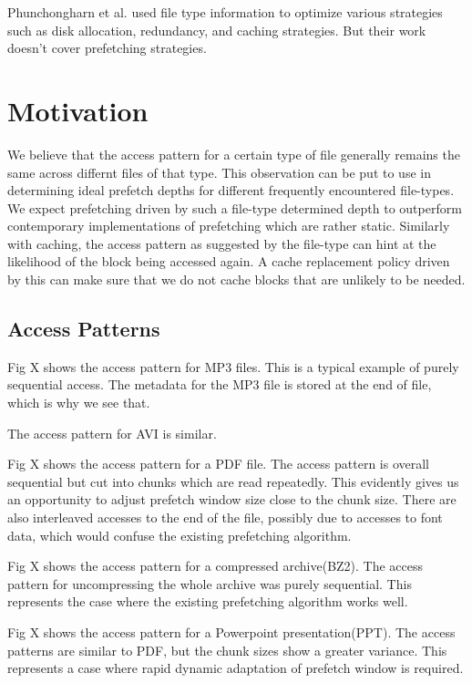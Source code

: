 \documentclass[twocolumn,10pt]{article}
\begin{document}
Phunchongharn et al. \cite{14} used file type information to optimize
various strategies such as disk allocation, redundancy, and caching
strategies. But their work doesn't cover prefetching strategies.

\section{Motivation}

We believe that the access pattern for a certain type of file generally remains the same 
across differnt files of that type. This observation can be put to use in determining ideal 
prefetch depths for different frequently encountered file-types. We expect prefetching
driven by such a file-type determined depth to outperform contemporary implementations
of prefetching which are rather static. Similarly with caching, the access pattern as suggested
by the file-type can hint at the likelihood of the block being accessed again. A cache
replacement policy driven by this can make sure that we do not cache blocks that are 
unlikely to be needed.

\subsection{Access Patterns}

Fig X shows the access pattern for MP3 files. This is a typical example of purely
sequential access. The metadata for the MP3 file is stored at the end of file, which
is why we see that. 

The access pattern for AVI is similar.

Fig X shows the access pattern for a PDF file. The access pattern is overall sequential
but cut into chunks which are read repeatedly. This evidently gives us an opportunity to
adjust prefetch window size close to the chunk size. There are also interleaved accesses
to the end of the file, possibly due to accesses to font data, which would confuse the
existing prefetching algorithm.

Fig X shows the access pattern for a compressed archive(BZ2). The access pattern for
uncompressing the whole archive was purely sequential. This represents the case where
the existing prefetching algorithm works well.

Fig X shows the access pattern for a Powerpoint presentation(PPT). The access patterns
are similar to PDF, but the chunk sizes show a greater variance. This represents a 
case where rapid dynamic adaptation of prefetch window is required.
\end{document}
